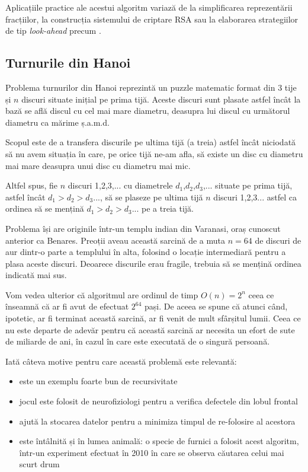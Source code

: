 Aplicațiile practice ale acestui algoritm variază de la simplificarea reprezentării fracțiilor, la construcția sistemului de criptare RSA \cite{Rivest:1978:MOD:359340.359342} sau la elaborarea strategiilor de tip \textit{look-ahead} precum \cite{Gragg1994}.

\subsection{Turnurile din Hanoi}


Problema turnurilor din Hanoi reprezintă un puzzle matematic format din 3 tije și $n$ discuri situate inițial pe prima tijă. Aceste discuri sunt plasate astfel încât la bază se află discul cu cel mai mare diametru, deasupra lui discul cu următorul diametru ca mărime ș.a.m.d. 

Scopul este de a transfera discurile pe ultima tijă (a treia) astfel încât niciodată să nu avem situația în care, pe orice tijă ne-am afla, să existe un disc cu diametru mai mare deasupra unui disc cu diametru mai mic.

Altfel spus, fie $n$ discuri 1,2,3,... cu diametrele $d_1$,$d_2$,$d_3$,... situate pe prima tijă, astfel încât $d_{1}>d_{2}>d_{3}...$, să se plaseze pe ultima tijă $n$ discuri 1,2,3... astfel ca ordinea să se mențină $d_{1}>d_{2}>d_{3}...$ pe a treia tijă.

Problema își are originile într-un templu indian din Varanasi, oraș cunoscut anterior ca Benares. Preoții aveau această sarcină de a muta $n=64$ de discuri de aur dintr-o parte a templului în alta, folosind o locație intermediară pentru a plasa aceste discuri. Deoarece discurile erau fragile, trebuia să se mențină ordinea indicată mai sus.

Vom vedea ulterior că algoritmul are ordinul de timp $O(n)=2^n$ ceea ce înseamnă că ar fi avut de efectuat $2^64$ pași. De aceea se spune că atunci când, ipotetic, ar fi terminat această sarcină, ar fi venit de mult sfârșitul lumii. Ceea ce nu este departe de adevăr pentru că această sarcină ar necesita un efort de sute de miliarde de ani, în cazul în care este executată de o singură persoană.

Iată câteva motive pentru care această problemă este relevantă:

\begin{itemize}
	\item{este un exemplu foarte bun de recursivitate}
	\item{jocul este folosit de neurofiziologi pentru a verifica defectele din lobul frontal}
	\item{ajută la stocarea datelor pentru a minimiza timpul de re-folosire al acestora}
	\item{este întâlnită și în lumea animală: o specie de furnici a folosit acest algoritm, într-un experiment efectuat în 2010 în care se observa căutarea celui mai scurt drum \cite{Reid50}}
\end{itemize}

